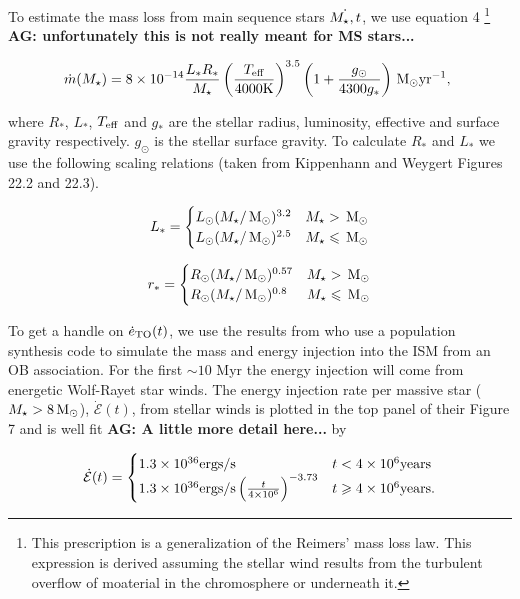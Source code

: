 To estimate the mass loss from main sequence stars $\dot{M_{\star},t}$,
we use equation 4 \citet{SchroderCuntz:2005a}\footnote{This
  prescription is a generalization of the Reimers' mass loss law. This
expression is derived assuming the stellar wind results from the
turbulent overflow of moaterial in the chromosphere or underneath it.} {\bf AG:
  unfortunately this is not really meant for MS stars...}

\begin{align}
  \dot{m}(M_{\star})=8 \times 10^{-14} \frac{L_* R_*}{M_{\star}}
  \left(\frac{T_{\rm eff}}{\rm 4000 K}\right)^{3.5}
  \left(1+\frac{g_{\odot}}{4300 g_*}\right) \,{\rm M_\odot} {\rm yr}^{-1},\
\end{align}

where  $R_*$, $L_*$, $T_{\rm eff}$ and $g_*$ are the stellar radius,
luminosity, effective and surface gravity respectively. $g_{\odot}$ is
the stellar surface gravity. To calculate $R_*$ and $L_*$ we use the
following scaling relations (taken from Kippenhann and Weygert Figures
22.2 and 22.3).

\begin{align}
L_*=
\begin{cases}
L_{\odot} (M_{\star}/\,{\rm M_\odot})^{3.2} & M_{\star} > \,{\rm M_\odot} \\
L_{\odot} (M_{\star}/\,{\rm M_\odot})^{2.5} & M_{\star} \leqslant \,{\rm M_\odot}
\end{cases}
\end{align}

\begin{align}
r_*=
\begin{cases}
R_{\odot} (M_{\star}/\,{\rm M_\odot})^{0.57} & M_{\star} > \,{\rm M_\odot} \\
R_{\odot} (M_{\star}/\,{\rm M_\odot})^{0.8} & M_{\star} \leqslant \,{\rm M_\odot}
\end{cases}
\end{align}


To get a handle on $\dot{e}_{\rm TO}(t)$, we use the results from
\citet{VossDiehl+:2009a} who use a population synthesis code to
simulate the mass and energy injection into the ISM from an OB
association. For the first $\sim 10$ Myr the energy injection will
come from energetic Wolf-Rayet star winds. The energy injection rate
per massive star ($M_{\star}>8 \,{\rm M_\odot}$), $\dot{\mathcal{E}} (t)$, from
stellar winds is plotted in the top panel of their Figure 7 and is
well fit {\bf AG: A little more detail here...} by

\begin{align}
\dot{\mathcal{E}} (t)=
\begin{cases}
  1.3 \times 10^{36} {\rm ergs/s} & t<4 \times 10^6 {\rm years}\\
  1.3  \times 10^{36} {\rm ergs/s} \left(\frac{t}{4 \times  10^6}\right)^{-3.73} & t \ge 4 \times 10^6 {\rm years}.
\end{cases}
\label{eq:voss}
\end{align}

